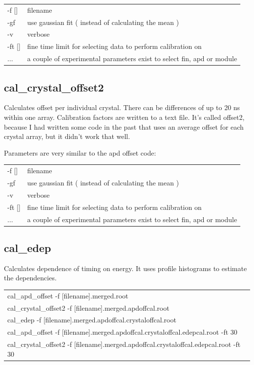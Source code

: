 \documentclass[12pt]{article}
\begin{document}
\begin{tabular}{ll}
-f [] & filename\\
-gf  & use gaussian fit ( instead of calculating the mean )\\
-v & verbose\\
-ft [] & fine time limit for selecting data to perform calibration on\\
$\ldots$ & a couple of experimental parameters exist to select fin, apd or module\\
\end{tabular}

\subsection{cal\_crystal\_offset2}
Calculates offset per individual crystal. There can be differences of up to 20 ns within one array. Calibration factors are written to a text file.  It's called offset2, because I had written some code in the past that uses an average offset for each crystal array, but it didn't work that well. 

Parameters are very similar to the apd offset code:\\

\begin{tabular}{ll}
-f [] & filename\\
-gf  & use gaussian fit ( instead of calculating the mean )\\
-v & verbose\\
-ft [] & fine time limit for selecting data to perform calibration on\\
$\ldots$ & a couple of experimental parameters exist to select fin, apd or module\\
\end{tabular}


\subsection{cal\_edep}
Calculates dependence of timing on energy. It uses profile histograms to estimate the dependencies.


\begin{tabular}{l}
cal\_apd\_offset -f [filename].merged.root\\
cal\_crystal\_offset2 -f [filename].merged.apdoffcal.root\\
cal\_edep -f [filename].merged.apdoffcal.crystaloffcal.root\\
cal\_apd\_offset -f [filename].merged.apdoffcal.crystaloffcal.edepcal.root -ft 30\\
cal\_crystal\_offset2 -f [filename].merged.apdoffcal.crystaloffcal.edepcal.root -ft 30\\
\end{tabular}
\end{document}
